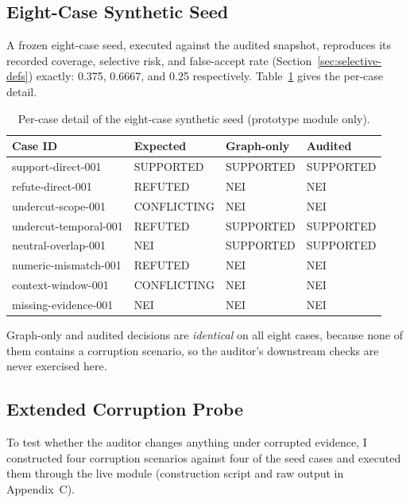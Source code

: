 \documentclass[12pt,a4paper,openany]{report}
\begin{document}
\subsection{Eight-Case Synthetic Seed}
A frozen eight-case seed, executed against the audited snapshot, reproduces
its recorded coverage, selective risk, and false-accept rate
(Section~\ref{sec:selective-defs}) exactly: 0.375, 0.6667, and 0.25
respectively. Table~\ref{tab:seed-detail-2} gives the per-case detail.

\begin{table}[H]
\centering
\caption{Per-case detail of the eight-case synthetic seed (prototype module only).}
\label{tab:seed-detail-2}
\small
\begin{tabularx}{\textwidth}{p{3.3cm}p{2.4cm}p{2.2cm}p{2.2cm}}
\toprule
Case ID & Expected & Graph-only & Audited \\
\midrule
support-direct-001 & SUPPORTED & SUPPORTED & SUPPORTED \\
refute-direct-001 & REFUTED & NEI & NEI \\
undercut-scope-001 & CONFLICTING & NEI & NEI \\
undercut-temporal-001 & REFUTED & SUPPORTED & SUPPORTED \\
neutral-overlap-001 & NEI & SUPPORTED & SUPPORTED \\
numeric-mismatch-001 & REFUTED & NEI & NEI \\
context-window-001 & CONFLICTING & NEI & NEI \\
missing-evidence-001 & NEI & NEI & NEI \\
\bottomrule
\end{tabularx}
\end{table}

Graph-only and audited decisions are \emph{identical} on all eight cases, because none of them contains a corruption scenario, so the auditor's downstream checks are never exercised here.

\subsection{Extended Corruption Probe}
To test whether the auditor changes anything under corrupted evidence, I constructed four corruption scenarios against four of the seed cases and executed them through the live module (construction script and raw output in Appendix~C).
\end{document}

